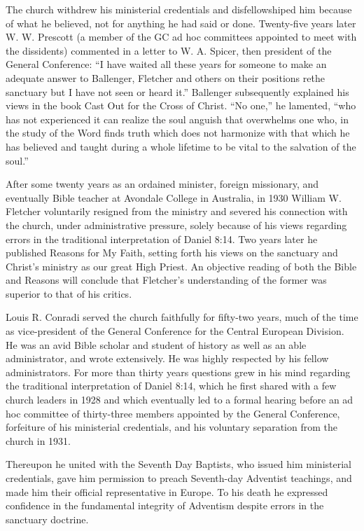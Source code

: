 The church withdrew his ministerial credentials and disfellowshiped him
because of what he believed, not for anything he had said or done.
Twenty-five years later W. W. Prescott (a member of the GC ad hoc committees
appointed to meet with the dissidents) commented in a letter to W. A.
Spicer, then president of the General Conference: ``I have waited all these
years for someone to make an adequate answer to Ballenger, Fletcher and
others on their positions re\. the sanctuary but I have not seen or heard
it.'' Ballenger subsequently explained his views in the book Cast Out for the
Cross of Christ. ``No one,'' he lamented, ``who has not experienced it can
realize the soul anguish that overwhelms one who, in the study of the Word
finds truth which does not harmonize with that which he has believed and
taught during a whole lifetime to be vital to the salvation of the soul.''\cite{21, 20a}

After some twenty years as an ordained minister, foreign missionary, and
eventually Bible teacher at Avondale College in Australia, in 1930 William
W. Fletcher voluntarily resigned from the ministry and severed his
connection with the church, under administrative pressure, solely because of
his views regarding errors in the traditional interpretation of Daniel 8:14.
Two years later he published Reasons for My Faith, setting forth his views
on the sanctuary and Christ's ministry as our great High Priest. An
objective reading of both the Bible and Reasons will conclude that
Fletcher's understanding of the former was superior to that of his
critics.\cite{22}

Louis R. Conradi served the church faithfully for fifty-two years, much of
the time as vice-president of the General Conference for the Central
European Division. He was an avid Bible scholar and student of history as
well as an able administrator, and wrote extensively. He was highly
respected by his fellow administrators. For more than thirty years questions
grew in his mind regarding the traditional interpretation of Daniel 8:14,
which he first shared with a few church leaders in 1928 and which eventually
led to a formal hearing before an ad hoc committee of thirty-three members
appointed by the General Conference, forfeiture of his ministerial
credentials, and his voluntary separation from the church in 1931. 

Thereupon he united with the Seventh Day Baptists, who issued him
ministerial credentials, gave him permission to preach Seventh-day Adventist
teachings, and made him their official representative in Europe. To his 
death he expressed confidence in the fundamental integrity of Adventism
despite errors in the sanctuary doctrine.

